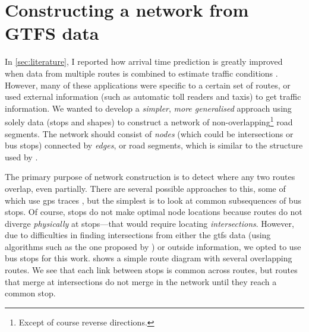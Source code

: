

\section{Constructing a network from GTFS data}
\label{sec:route-segments}

In \cref{sec:literature}, I reported how arrival time prediction is greatly improved when data from multiple routes is combined to estimate traffic conditions \citep{Yu_2011}. However, many of these applications were specific to a certain set of routes, or used external information (such as automatic toll readers and taxis) to get \rt{} traffic information. We wanted to develop a \emph{simpler}, \emph{more generalised} approach using solely \GTFS{} data (stops and shapes) to construct a network of non-overlapping\footnote{Except of course reverse directions.} road segments. The network should consist of \emph{nodes} (which could be intersections or bus stops) connected by \emph{edges}, or road segments, which is similar to the structure used by \citet{Celan_2017,Vuurstaek_2018}.


The primary purpose of network construction is to detect where any two routes overlap, even partially. There are several possible approaches to this, some of which use \gls{gps} traces \citep{Xie_2016,Zhang_2017}, but the simplest is to look at common subsequences of bus stops. Of course, stops do not make optimal node locations because routes do not diverge \emph{physically} at stops---that would require locating \emph{intersections}. However, due to difficulties in finding intersections from either the \gls{gtfs} data (using algorithms such as the one proposed by \cite{Xie_2016}) or outside information, we opted to use bus stops for this work.  shows a simple route diagram with several overlapping routes. We see that each link between stops is common across routes, but routes that merge at intersections do not merge in the network until they reach a common stop.


